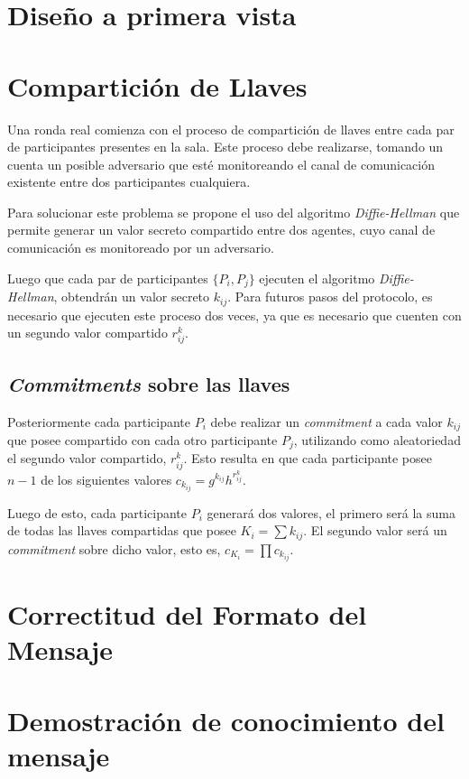 \section{Diseño a primera vista}
\section{Compartición de Llaves}

Una ronda real comienza con el proceso de compartición de llaves entre cada par de participantes presentes en la sala. Este proceso debe realizarse, tomando un cuenta un posible adversario que esté monitoreando el canal de comunicación existente entre dos participantes cualquiera.

Para solucionar este problema se propone el uso del algoritmo \emph{Diffie-Hellman} \cite{diffie1976new} que permite generar un valor secreto compartido entre dos agentes, cuyo canal de comunicación es monitoreado por un adversario.

Luego que cada par de participantes $\{P_i, P_j\}$ ejecuten el algoritmo \emph{Diffie-Hellman}, obtendrán un valor secreto $k_{ij}$. Para futuros pasos del protocolo, es necesario que ejecuten este proceso dos veces, ya que es necesario que cuenten con un segundo valor compartido $r^k_{ij}$.

\subsection{\emph{Commitments} sobre las llaves}

Posteriormente cada participante $P_i$ debe realizar un \emph{commitment} a cada valor $k_{ij}$ que posee compartido con cada otro participante $P_j$, utilizando como aleatoriedad el segundo valor compartido, $r^k_{ij}$. Esto resulta en que cada participante posee $n - 1$ de los siguientes valores $c_{k_{ij}} = g^{k_{ij}} h^{r^k_{ij}}$.

Luego de esto, cada participante $P_i$ generará dos valores, el primero será la suma de todas las llaves compartidas que posee $K_i = \sum k_{ij}$. El segundo valor será un \emph{commitment} sobre dicho valor, esto es, $c_{K_i} = \prod c_{k_{ij}}$.

\section{Correctitud del Formato del Mensaje}
\section{Demostración de conocimiento del mensaje}
